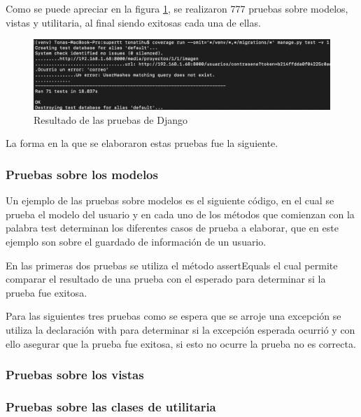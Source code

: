 Como se puede apreciar en la figura \ref{fig:pruebasDjango}, se realizaron 777 pruebas sobre modelos, vistas y utilitaria, al final siendo exitosas cada una de ellas.

\begin{figure}[H]
	\centering
	\includegraphics[width=450px]{capitulo6/unitarias/img/pruebasDjango.png}
	\caption{Resultado de las pruebas de Django}
	\label{fig:pruebasDjango}
\end{figure}

La forma en la que se elaboraron estas pruebas fue la siguiente.

\subsubsection{Pruebas sobre los modelos}

Un ejemplo de las pruebas sobre modelos es el siguiente código, en el cual se prueba el modelo del usuario y en cada uno de los métodos que comienzan con la palabra test determinan los diferentes casos de prueba a elaborar, que en este ejemplo son sobre el guardado de información de un usuario.



En las primeras dos pruebas se utiliza el método assertEquals el cual permite comparar el resultado de una prueba con el esperado para determinar si la prueba fue exitosa.

Para las siguientes tres pruebas como se espera que se arroje una excepción se utiliza la declaración with para determinar si la excepción esperada ocurrió y con ello asegurar que la prueba fue exitosa, si esto no ocurre la prueba no es correcta. 

\subsubsection{Pruebas sobre los vistas}



\subsubsection{Pruebas sobre las clases de utilitaria}


